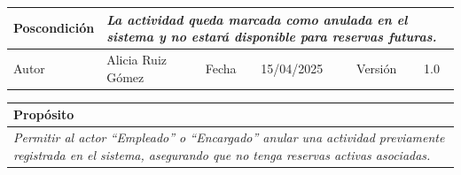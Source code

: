\begin{table}[H]
\begin{tabular}{llllllll}
    \multicolumn{1}{|l|}{Poscondición}                           & \multicolumn{7}{p{10cm}|}{{\color[HTML]{808080} \textit{La actividad queda marcada como anulada en el sistema y no estará disponible para reservas futuras.}}}                                                                                                                                                                                                                                                       \\ \hline
    \multicolumn{1}{|l|}{Autor}                                  & \multicolumn{1}{l|}{{\color[HTML]{808080} \textit{}Alicia Ruiz Gómez}}                           & \multicolumn{2}{l|}{Fecha}                                                   & \multicolumn{1}{l|}{{\color[HTML]{808080} \textit{}15/04/2025}}                         & \multicolumn{2}{l|}{Versión}                                                      & \multicolumn{1}{l|}{1.0}                                                     \\ \hline
    \end{tabular}
\end{table}

\begin{table}[H]
    \begin{tabular}{llllllll}
    \hline
    \multicolumn{8}{|l|}{\cellcolor[HTML]{F2F2F2}Propósito}                                                                                                                                                                                                                                                                                                                                                                                           \\ \hline
    \multicolumn{8}{|p{15cm}|}{{\color[HTML]{808080} \textit{Permitir al actor “Empleado” o “Encargado” anular una actividad previamente registrada en el sistema, asegurando que no tenga reservas activas asociadas.}}}                                                                                                                                                                                                             \\ \hline
    \end{tabular}
\end{table}

